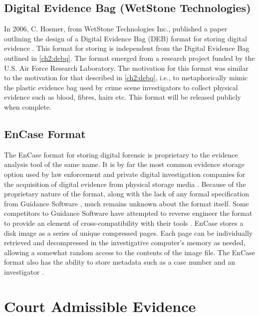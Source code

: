 \documentclass[runningheads,a4paper]{llncs}
\begin{document}
\subsection{Digital Evidence Bag (WetStone Technologies)}
\label{ch2:debwet}

In 2006, C. Hosmer, from WetStone Technologies Inc., published a paper outlining the design of a Digital Evidence Bag (DEB) format for storing digital evidence \cite{debwet}. This format for storing is independent from the Digital Evidence Bag outlined in \ref{ch2:debq}. The format emerged from a research project funded by the U.S. Air Force Research Laboratory. The motivation for this format was similar to the motivation for that described in \ref{ch2:debq}, i.e., to metaphorically mimic the plastic evidence bag used by crime scene investigators to collect physical evidence such as blood, fibres, hairs etc. This format will be released publicly when complete.

\subsection{EnCase Format}
\label{ch2:encaseformat}

The EnCase format for storing digital forensic is proprietary to the evidence analysis tool of the same name. It is by far the most common evidence storage option used by law enforcement and private digital investigation companies for the acquisition of digital evidence from physical storage media \cite{containers}. Because of the proprietary nature of the format, along with the lack of any formal specification from Guidance Software \cite{guidance}, much remains unknown about the format itself. Some competitors to Guidance Software have attempted to reverse engineer the format to provide an element of cross-compatibility with their tools \cite{aaf}. EnCase stores a disk image as a series of unique compressed pages. Each page can be individually retrieved and decompressed in the investigative computer's memory as needed, allowing a somewhat random access to the contents of the image file. The EnCase format also has the ability to store metadata such as a case number and an investigator \cite{aaf}.

\section{Court Admissible Evidence}
\label{ch2:legal}
\end{document}

